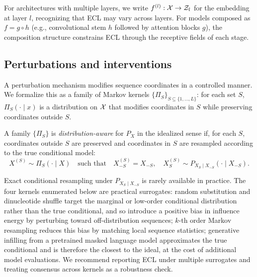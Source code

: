 For architectures with multiple layers, we write $f^{(l)}:\mathcal{X} \to \mathcal{Z}_l$ for the embedding at layer $l$, recognizing that ECL may vary across layers. For models composed as $f = g \circ h$ (e.g., convolutional stem $h$ followed by attention blocks $g$), the composition structure constrains ECL through the receptive fields of each stage.

\subsection{Perturbations and interventions}

A perturbation mechanism modifies sequence coordinates in a controlled manner. We formalize this as a family of Markov kernels $\{\Pi_{S}\}_{S\subseteq\{1,\dots,L\}}$: for each set $S$, $\Pi_S(\cdot\mid x)$ is a distribution on $\mathcal{X}$ that modifies coordinates in $S$ while preserving coordinates outside $S$.

\begin{definition}\label{def:perturbation}
A family $\{\Pi_S\}$ is \emph{distribution-aware} for $P_X$ in the idealized sense if, for each $S$, coordinates outside $S$ are preserved and coordinates in $S$ are resampled according to the true conditional model:
\[
X^{(S)} \sim \Pi_S(\cdot\mid X) \quad \text{such that}\quad X^{(S)}_{-S}=X_{-S},\quad X^{(S)}_{S}\sim P_{X_S\mid X_{-S}}(\cdot\mid X_{-S}).
\]
\end{definition}

\begin{remark}\label{rem:perturbation_surrogates}
Exact conditional resampling under $P_{X_S\mid X_{-S}}$ is rarely available in practice. The four kernels enumerated below are practical surrogates: random substitution and dinucleotide shuffle target the marginal or low-order conditional distribution rather than the true conditional, and so introduce a positive bias in influence energy by perturbing toward off-distribution sequences; $k$-th order Markov resampling reduces this bias by matching local sequence statistics; generative infilling from a pretrained masked language model approximates the true conditional and is therefore the closest to the ideal, at the cost of additional model evaluations. We recommend reporting ECL under multiple surrogates and treating consensus across kernels as a robustness check.
\end{remark}

